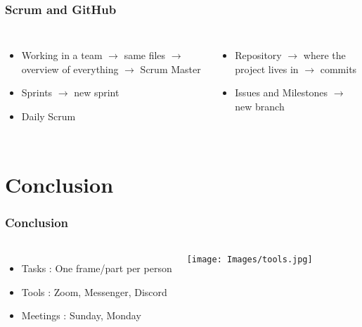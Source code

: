 \documentclass{beamer}
\begin{document}
\begin{frame}
    \frametitle{Scrum and GitHub}
        \begin{columns}
            \center {}
            \begin{itemize}
            \item<1-> Working in a team \linebreak
            $\rightarrow$ same files \linebreak
            $\rightarrow$ overview of everything \linebreak
            $\rightarrow$ Scrum Master
            \item<3-> Sprints \linebreak
            $\rightarrow$ new sprint
            \item<5-> Daily Scrum
            \end{itemize}
            
            \center {}
            \begin{itemize}
            \item<2-> Repository \linebreak
            $\rightarrow$ where the project lives in \linebreak
            $\rightarrow$ commits \linebreak
            \item<4-> Issues and Milestones \linebreak
            $\rightarrow$ new branch \linebreak
            \end{itemize}
        \end{columns}
        \medskip
\end{frame}


\section{Conclusion}

\begin{frame}
	\frametitle{Conclusion}
	\begin{columns}
		\begin{itemize}
			\item Tasks : One frame/part per person
			\item Tools : Zoom, Messenger, Discord
			\item Meetings : Sunday, Monday
		\end{itemize}

		\texttt{[image: Images/tools.jpg]}
	\end{columns}

\end{frame}
\end{document}

